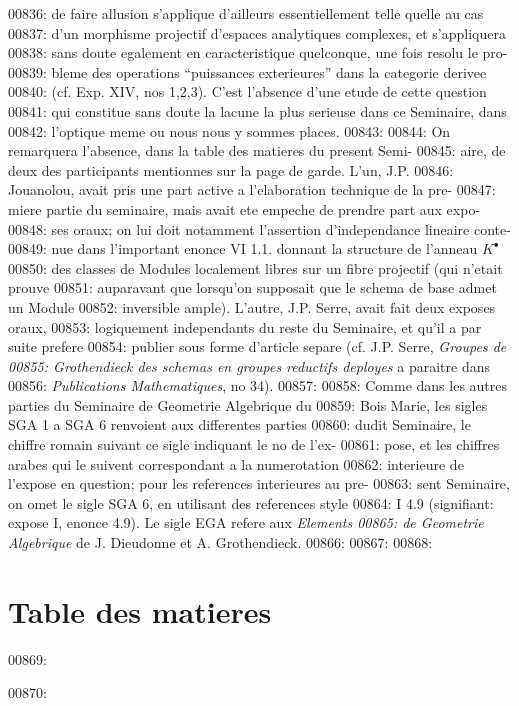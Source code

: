00836: de faire allusion s'applique d'ailleurs essentiellement telle quelle au cas
00837: d'un morphisme projectif d'espaces analytiques complexes, et s'appliquera
00838: sans doute egalement en caracteristique quelconque, une fois resolu le pro-
00839: bleme des operations ``puissances exterieures'' dans la categorie derivee
00840: (cf. Exp. XIV, nos 1,2,3). C'est l'absence d'une etude de cette question
00841: qui constitue sans doute la lacune la plus serieuse dans ce Seminaire, dans
00842: l'optique meme ou nous nous y sommes places.
00843: 
00844: On remarquera l'absence, dans la table des matieres du present Semi-
00845: aire, de deux des participants mentionnes sur la page de garde. L'un, J.P.
00846: Jouanolou, avait pris une part active a l'elaboration technique de la pre-
00847: miere partie du seminaire, mais avait ete empeche de prendre part aux expo-
00848: ses oraux; on lui doit notamment l'assertion d'independance lineaire conte-
00849: nue dans l'important enonce VI 1.1. donnant la structure de l'anneau $K^{\bullet}$
00850: des classes de Modules localement libres sur un fibre projectif (qui n'etait prouve
00851: auparavant que lorsqu'on supposait que le schema de base admet un Module
00852: inversible ample). L'autre, J.P. Serre, avait fait deux exposes oraux,
00853: logiquement independants du reste du Seminaire, et qu'il a par suite prefere
00854: publier sous forme d'article separe (cf. J.P. Serre, \textit{Groupes de
00855: Grothendieck des schemas en groupes reductifs deployes} a paraitre dans
00856: \textit{Publications Mathematiques}, no 34).
00857: 
00858: Comme dans les autres parties du Seminaire de Geometrie Algebrique du
00859: Bois Marie, les sigles SGA 1 a SGA 6 renvoient aux differentes parties
00860: dudit Seminaire, le chiffre romain suivant ce sigle indiquant le no de l'ex-
00861: pose, et les chiffres arabes qui le suivent correspondant a la numerotation
00862: interieure de l'expose en question; pour les references interieures au pre-
00863: sent Seminaire, on omet le sigle SGA 6, en utilisant des references style
00864: I 4.9 (signifiant: expose I, enonce 4.9). Le sigle EGA refere aux \textit{Elements
00865: de Geometrie Algebrique} de J. Dieudonne et A. Grothendieck.
00866: 
00867: 
00868: \section*{Table des matieres}
00869: 
00870: 
